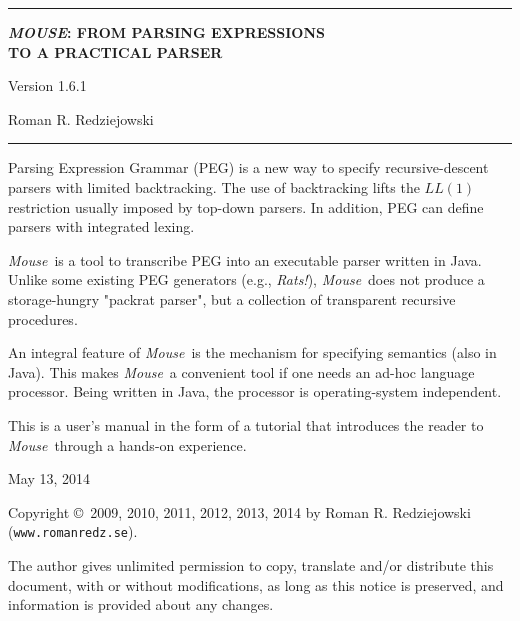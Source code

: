 \documentclass[a4paper,fleqn]{article}
\newcommand{\Version}{1.6.1}
\newcommand{\Mouse}{\textsl{Mouse}}
\newcommand{\tx}[1]{\texttt{#1}}
\begin{document}
\pagestyle{empty}
\begin{center}
\rule{\linewidth-20mm}{.5mm}

\bigskip
\Large \textbf{\textit{MOUSE}: FROM PARSING EXPRESSIONS\\TO A PRACTICAL PARSER}

\bigskip
\Large Version \Version

\bigskip
\Large Roman R. Redziejowski
\rule{\linewidth-20mm}{.5mm}




\normalsize
\parbox{0.875\linewidth}{
\noindent
Parsing Expression Grammar (PEG) is a new way to specify
recursive-descent parsers with limited backtracking.
The use of backtracking lifts the $LL(1)$ restriction usually imposed
by top-down parsers.
In addition, PEG can define parsers with integrated lexing.

\medskip
\noindent
\Mouse\ is a tool to transcribe PEG into an executable parser written in Java.
Unlike some existing PEG generators (e.g., \textsl{Rats!}), \Mouse\
does not produce a storage-hungry "packrat parser",
but a collection of transparent recursive procedures.

\medskip
\noindent
An integral feature of \Mouse\ is the mechanism for specifying
semantics (also in Java).
This makes \Mouse\ a convenient tool if one needs an ad-hoc language processor.
Being written in Java, the processor is operating-system independent.

\medskip
\noindent
This is a user's manual in the form of a tutorial
that introduces the reader to \Mouse\ through 
a hands-on experience.}
\end{center}

\begin{center}
May 13, 2014

\end{center}
\newpage


\noindent
Copyright \copyright\ 2009, 2010, 2011, 2012, 2013, 2014 by Roman R. Redziejowski (\tx{www.romanredz.se}).

\noindent
The author gives unlimited permission to copy, translate and/or distribute
this document, with or without modifications, 
as long as this notice is preserved,
and information is provided about any changes.
\end{document}
